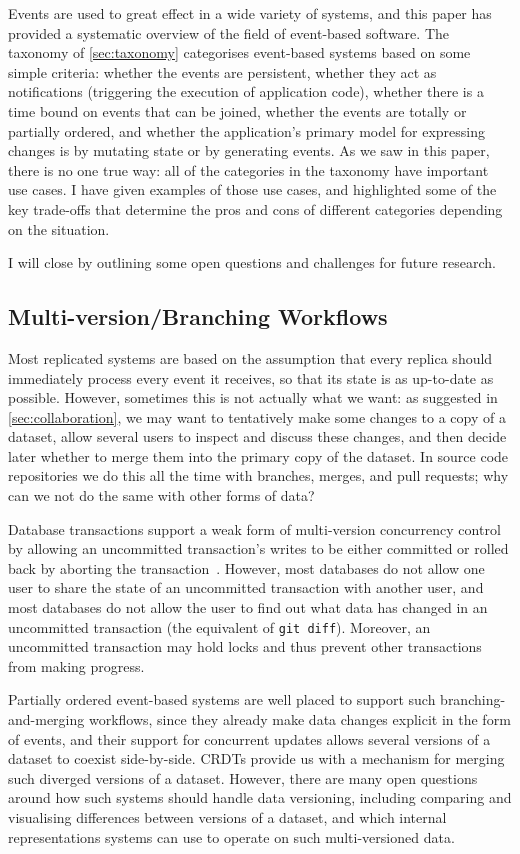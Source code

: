 \documentclass[sigconf]{acmart}
\begin{document}
Events are used to great effect in a wide variety of systems, and this paper has provided a systematic overview of the field of event-based software.
The taxonomy of \autoref{sec:taxonomy} categorises event-based systems based on some simple criteria: whether the events are persistent, whether they act as notifications (triggering the execution of application code), whether there is a time bound on events that can be joined, whether the events are totally or partially ordered, and whether the application's primary model for expressing changes is by mutating state or by generating events.
As we saw in this paper, there is no one true way: all of the categories in the taxonomy have important use cases.
I have given examples of those use cases, and highlighted some of the key trade-offs that determine the pros and cons of different categories depending on the situation.

I will close by outlining some open questions and challenges for future research.

\subsection{Multi-version/Branching Workflows}

Most replicated systems are based on the assumption that every replica should immediately process every event it receives, so that its state is as up-to-date as possible.
However, sometimes this is not actually what we want: as suggested in \autoref{sec:collaboration}, we may want to tentatively make some changes to a copy of a dataset, allow several users to inspect and discuss these changes, and then decide later whether to merge them into the primary copy of the dataset.
In source code repositories we do this all the time with branches, merges, and pull requests; why can we not do the same with other forms of data?

Database transactions support a weak form of multi-version concurrency control by allowing an uncommitted transaction's writes to be either committed or rolled back by aborting the transaction~\cite{Bernstein:1983}.
However, most databases do not allow one user to share the state of an uncommitted transaction with another user, and most databases do not allow the user to find out what data has changed in an uncommitted transaction (the equivalent of \verb+git diff+).
Moreover, an uncommitted transaction may hold locks and thus prevent other transactions from making progress.

Partially ordered event-based systems are well placed to support such branching-and-merging workflows, since they already make data changes explicit in the form of events, and their support for concurrent updates allows several versions of a dataset to coexist side-by-side.
CRDTs provide us with a mechanism for merging such diverged versions of a dataset.
However, there are many open questions around how such systems should handle data versioning, including comparing and visualising differences between versions of a dataset, and which internal representations systems can use to operate on such multi-versioned data.
\end{document}
